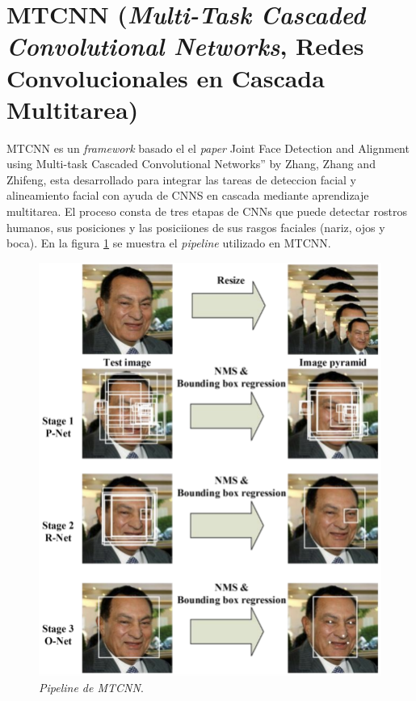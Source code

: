 \section{MTCNN (\textit{Multi-Task Cascaded Convolutional Networks}, Redes Convolucionales en Cascada Multitarea)}
MTCNN es un \textit{framework} basado el el \textit{paper} Joint Face Detection and Alignment using Multi-task Cascaded Convolutional Networks” by Zhang, Zhang and Zhifeng, esta desarrollado para integrar las tareas de deteccion facial y alineamiento facial con ayuda de CNNS en cascada mediante aprendizaje multitarea. El proceso consta de tres etapas de CNNs que puede detectar rostros humanos, sus posiciones y las posiciiones de sus rasgos faciales (nariz, ojos y boca). En la figura \ref{fig:mtcnn_pipe} se muestra el \textit{pipeline} utilizado en MTCNN.

\begin{figure}[h]
	\centering
	\includegraphics[scale=0.5]{./Figures/mtcnn_pipe.png}
	\caption{\textit{Pipeline de MTCNN}.}
	\label{fig:mtcnn_pipe}
\end{figure}

